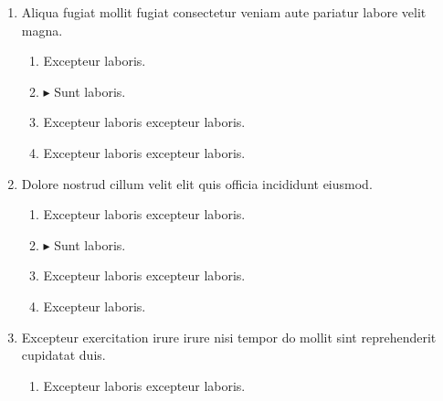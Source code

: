 \documentclass[a4paper,12pt]{article}
\begin{document}
\begin{enumerate}[label=\textbf{\arabic*.}]
\begin{multicols}{2}
\begin{enumerate}
		\item $\blacktriangleright$  Sunt laboris.
    
		\item  Excepteur laboris excepteur laboris.
    
		\item  Excepteur laboris.
    
	\end{enumerate}

\end{multicols}
\item Aliqua fugiat mollit fugiat consectetur veniam aute pariatur labore velit magna.
\begin{multicols}{2}
	\begin{enumerate}
		\item  Excepteur laboris.
    
		\item $\blacktriangleright$  Sunt laboris.
    
		\item  Excepteur laboris excepteur laboris.
  
		\item  Excepteur laboris excepteur laboris.
    
	\end{enumerate}

\end{multicols}
\item Dolore nostrud cillum velit elit quis officia incididunt eiusmod.
\begin{multicols}{2}
	\begin{enumerate}
		\item  Excepteur laboris excepteur laboris.
    
		\item $\blacktriangleright$  Sunt laboris.
    
		\item  Excepteur laboris excepteur laboris.
  
		\item  Excepteur laboris.
    
	\end{enumerate}

\end{multicols}
\item Excepteur exercitation irure irure nisi tempor do mollit sint reprehenderit cupidatat duis.
\begin{multicols}{2}
	\begin{enumerate}
		\item  Excepteur laboris excepteur laboris.
  

\end{enumerate}
\end{multicols}
\end{enumerate}
\end{document}
